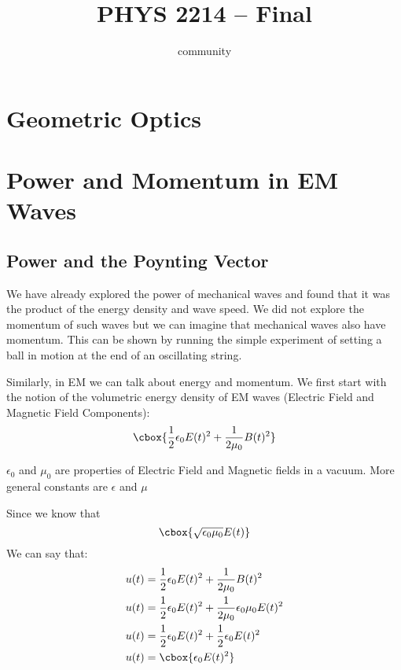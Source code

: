 \documentclass{hw} \title{PHYS 2214 -- Final} \author{community}
\numberwithin{equation}{section}
\begin{document}
 \maketitle

\tableofcontents \newpage{}

\section{Geometric Optics}

\section{Power and Momentum in EM Waves} \subsection{Power and the Poynting
Vector} We have already explored the power of mechanical waves and found that
it was the product of the energy density and wave speed. We did not explore the
momentum of such waves but we can imagine that mechanical waves also have
momentum. This can be shown by running the simple experiment of setting a ball
in motion at the end of an oscillating string.

Similarly, in EM we can talk about energy and momentum. We first start with the
notion of the volumetric energy density of EM waves (Electric Field and
Magnetic Field Components): \begin{equation} \cbox{%
    \frac{1}{2}\epsilon_0 E(t)^2+\frac{1}{2\mu_0}B(t)^2 } \end{equation}

$\epsilon_0$ and $\mu_0$ are properties of Electric Field and Magnetic fields
in a vacuum. More general constants are $\epsilon$ and $\mu$

Since we know that \begin{equation} \cbox{%
  \sqrt{\epsilon_0 \mu_0} E(t) } \end{equation} We can say that: \begin{align}
    u(t) &= \frac{1}{2} \epsilon_0 E(t)^2 + \frac{1}{2 \mu_0} B(t)^2      \\
    u(t) &= \frac{1}{2} \epsilon_0 E(t)^2 + \frac{1}{2 \mu_0} \epsilon_0 \mu_0
    E(t)^2                     \\ u(t) &= \frac{1}{2} \epsilon_0 E(t)^2 +
 \frac{1}{2} \epsilon_0 E(t)^2 \\ u(t) &= \cbox{\epsilon_0 E(t)^2} \end{align}
\end{document}

